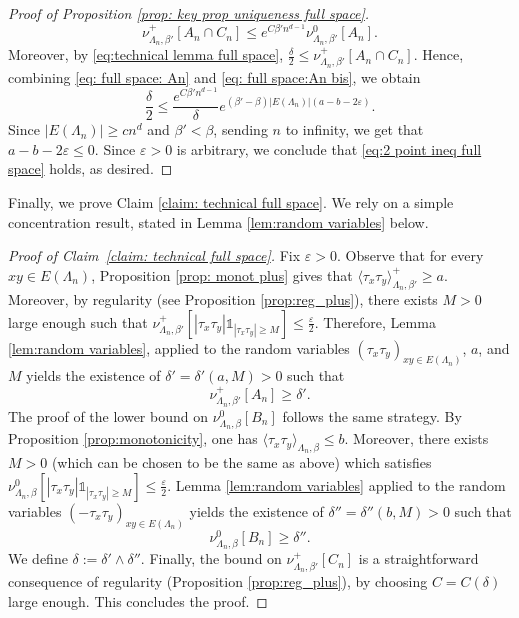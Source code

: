 \documentclass[11pt,a4paper]{article}
\numberwithin{equation}{section}
\theoremstyle{plain}
\theoremstyle{definition}
\begin{document}
\begin{proof}[Proof of Proposition \textup{\ref{prop: key prop uniqueness full space}}]
\begin{equation}
    \nu^+_{\Lambda_n,\beta'}[A_n\cap C_n]\leq e^{C\beta' n^{d-1}}\nu^0_{\Lambda_n,\beta'}[A_n].
\end{equation}
Moreover, by \eqref{eq:technical lemma full space}, $\frac{\delta}{2}\leq \nu^+_{\Lambda_n,\beta'}[A_n\cap C_n]$. Hence, combining \eqref{eq: full space: An} and \eqref{eq: full space:An bis}, we obtain
\begin{equation} \label{eq: full space cornd}
\frac{\delta}{2} \leq \frac{e^{C\beta' n^{d-1}}}{\delta}e^{(\beta'-\beta)|E(\Lambda_n)|(a-b-2\varepsilon)}. 
\end{equation}
Since $|E(\Lambda_n)|\geq cn^d$ and $\beta'<\beta$, sending $n$ to infinity, we get that $a-b-2\varepsilon\leq 0$. Since $\varepsilon>0$ is arbitrary, we conclude that \eqref{eq:2 point ineq full space} holds, as desired. 
\end{proof}


Finally, we prove Claim \ref{claim: technical full space}. We rely on a simple concentration result, stated in Lemma \ref{lem:random variables} below.


\begin{proof}[Proof of Claim~\textup{\ref{claim: technical full space}}] 

Fix $\varepsilon>0$. Observe that for every $xy\in E(\Lambda_n)$, Proposition \ref{prop: monot plus} gives that $\langle\tau_x\tau_y\rangle_{\Lambda_n,\beta'}^+\geq a$. Moreover, by regularity (see Proposition \ref{prop:reg_plus}), there exists $M>0$ large enough such that $\nu_{\Lambda_n,\beta'}^+[|\tau_x\tau_y|\mathds{1}_{|\tau_x\tau_y|\geq M}]\leq \tfrac{\varepsilon}{2}$. Therefore, Lemma \ref{lem:random variables}, applied to the random variables $(\tau_x\tau_y)_{xy\in E(\Lambda_n)}$, $a$, and $M$ yields the existence of $\delta'=\delta'(a,M)>0$ such that
\begin{equation}
    \nu_{\Lambda_n,\beta'}^+[A_n]\geq \delta'.
\end{equation}
The proof of the lower bound on $\nu_{\Lambda_n,\beta}^0[B_n]$ follows the same strategy. By Proposition \ref{prop:monotonicity}, one has $\langle \tau_x\tau_y\rangle_{\Lambda_n,\beta}\leq b$. Moreover, there exists $M>0$ (which can be chosen to be the same as above) which satisfies $\nu_{\Lambda_n,\beta}^0[|\tau_x\tau
_y|\mathds{1}_{|\tau_x\tau_y|\geq M}]\leq \tfrac{\varepsilon}{2}$.  Lemma \ref{lem:random variables} applied to the random variables $(-\tau
_x\tau_y)_{xy\in E(\Lambda_n)}$ yields the existence of $\delta''=\delta''(b,M)>0$ such that
\begin{equation}
    \nu_{\Lambda_n,\beta}^0[B_n]\geq \delta''.
\end{equation}
We define $\delta:=\delta'\wedge \delta''$. Finally, the bound on $\nu_{\Lambda_n,\beta'}^+[C_n]$ is a straightforward consequence of regularity (Proposition \ref{prop:reg_plus}), by choosing $C=C(\delta)$ large enough. This concludes the proof.
\end{proof}
\end{document}
